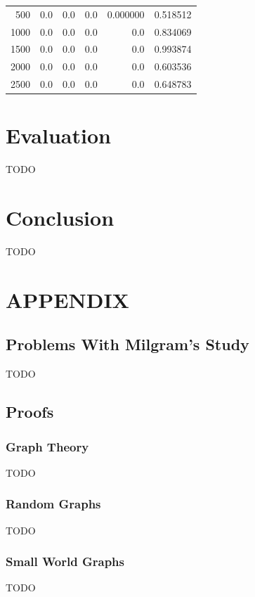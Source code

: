 \documentclass{article}
\begin{document}
\begin{tabular}{rrrrrr}
                500 &             0.0 &                    0.0 &                 0.0 &    0.000000 &   0.518512 \\
                1000 &             0.0 &                    0.0 &                 0.0 &         0.0 &   0.834069 \\
                1500 &             0.0 &                    0.0 &                 0.0 &         0.0 &   0.993874 \\
                2000 &             0.0 &                    0.0 &                 0.0 &         0.0 &   0.603536 \\
                2500 &             0.0 &                    0.0 &                 0.0 &         0.0 &   0.648783 \\
                \bottomrule
            \end{tabular}
                
                

                    
        
        
    \section{Evaluation}
    TODO
    \section{Conclusion}
    TODO

    \section{APPENDIX}
        \subsection{Problems With Milgram's Study}
        TODO
        \subsection{Proofs}
            \subsubsection{Graph Theory}
            TODO
            \subsubsection{Random Graphs}
            TODO
            \subsubsection{Small World Graphs}
            TODO
\end{document}
